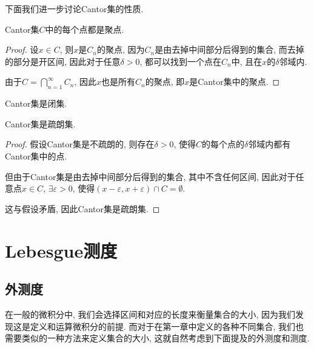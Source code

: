 \documentclass[theorem=false,mathfont=none,openany,sub3section]{easybook}
\newcommand{\btocgroup}[1][toc]{\addtocontents{#1}{\string\begingroup}}
\newcommand{\etocgroup}[1][toc]{\addtocontents{#1}{\string\endgroup}}
\begin{document}
下面我们进一步讨论Cantor集的性质.\par

\begin{proposition}
  Cantor集$C$中的每个点都是聚点.\par
\end{proposition}

\begin{proof}
  设$x\in C$, 则$x$是$C_n$的聚点, 因为$C_n$是由去掉中间部分后得到的集合, 而去掉的部分是开区间, 因此对于任意$\delta >0$, 都可以找到一个点在$C_n$中, 且在$x$的$\delta$邻域内.\par
  由于$C=\bigcap_{n=1}^{\infty}C_n$, 因此$x$也是所有$C_n$的聚点, 即$x$是Cantor集中的聚点.\par
\end{proof}

\begin{corollary}
  Cantor集是闭集.\par
\end{corollary}

\begin{proposition}
  Cantor集是疏朗集.\par
\end{proposition}

\begin{proof}
  假设Cantor集是不疏朗的, 则存在$\delta >0$, 使得$C$的每个点的$\delta$邻域内都有Cantor集中的点.\par
  但由于Cantor集是由去掉中间部分后得到的集合, 其中不含任何区间, 因此对于任意点$x\in C$, $\exists \varepsilon >0$, 使得$(x-\varepsilon,x+\varepsilon)\cap C=\emptyset$.\par
  这与假设矛盾, 因此Cantor集是疏朗集.\par
\end{proof}


\btocgroup
{}
\chapter{Lebesgue测度}

\etocgroup

\section{外测度}

在一般的微积分中, 我们会选择区间和对应的长度来衡量集合的大小, 因为我们发现这是定义和运算微积分的前提. 而对于在第一章中定义的各种不同集合, 我们也需要类似的一种方法来定义集合的大小, 这就自然考虑到下面提及的外测度和测度.\par
\end{document}
